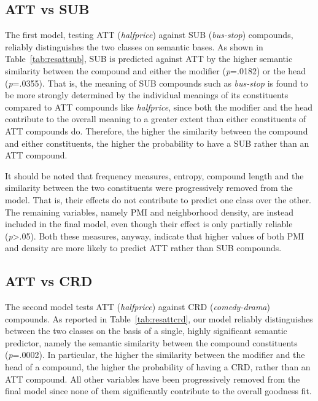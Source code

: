 \subsection{ATT vs SUB}

The first model, testing ATT (\emph{halfprice}) against SUB (\emph{bus-stop}) compounds, reliably distinguishes the two classes on semantic bases. As shown in Table~\ref{tab:resattsub}, SUB is predicted against ATT by the higher semantic similarity between the compound and either the modifier (\emph{p}=.0182) or the head (\emph{p}=.0355). That is, the meaning of SUB compounds such as \emph{bus-stop} is found to be more strongly determined by the individual meanings of its constituents compared to ATT compounds like \emph{halfprice}, since both the modifier and the head contribute to the overall meaning to a greater extent than either constituents of ATT compounds do. Therefore, the higher the similarity between the compound and either constituents, the higher the probability to have a SUB rather than an ATT compound.

It should be noted that frequency measures, entropy, compound length and the similarity between the two constituents were progressively removed from the model. That is, their effects do not contribute to predict one class over the other. The remaining variables, namely PMI and neighborhood density, are instead included in the final model, even though their effect is only partially reliable (\emph{p}>.05). Both these measures, anyway, indicate that higher values of both PMI and density are more likely to predict ATT rather than SUB compounds.



\subsection{ATT vs CRD}

The second model tests ATT (\emph{halfprice}) against CRD (\emph{comedy-drama}) compounds. As reported in Table~\ref{tab:resattcrd}, our model reliably distinguishes between the two classes on the basis of a single, highly significant semantic predictor, namely the semantic similarity between the compound constituents (\emph{p}=.0002). In particular, the higher the similarity between the modifier and the head of a compound, the higher the probability of having a CRD, rather than an ATT compound. All other variables have been progressively removed from the final model since none of them significantly contribute to the overall goodness fit.

